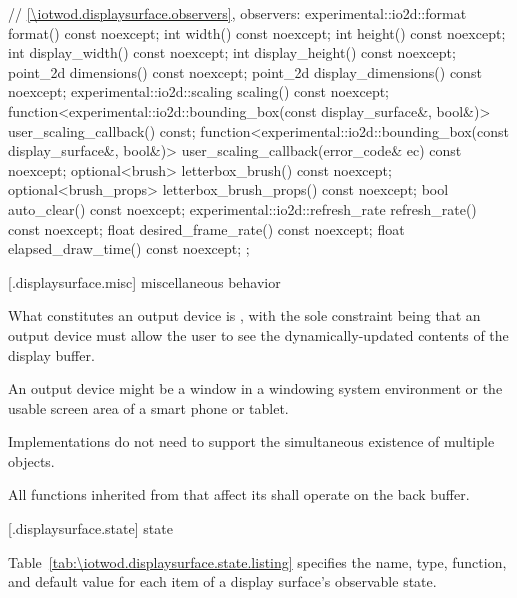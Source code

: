 \begin{codeblock}
{{    // \ref{\iotwod.displaysurface.observers}, observers:
    experimental::io2d::format format() const noexcept;
    int width() const noexcept;
    int height() const noexcept;
    int display_width() const noexcept;
    int display_height() const noexcept;
    point_2d dimensions() const noexcept;
    point_2d display_dimensions() const noexcept;
    experimental::io2d::scaling scaling() const noexcept;
    function<experimental::io2d::bounding_box(const display_surface&,
      bool&)> user_scaling_callback() const;
    function<experimental::io2d::bounding_box(const display_surface&,
      bool&)> user_scaling_callback(error_code& ec) const noexcept;
    optional<brush> letterbox_brush() const noexcept;
    optional<brush_props> letterbox_brush_props() const noexcept;
    bool auto_clear() const noexcept;
    experimental::io2d::refresh_rate refresh_rate() const noexcept;
    float desired_frame_rate() const noexcept;
    float elapsed_draw_time() const noexcept;
  };
}
\end{codeblock}

 [\iotwod.displaysurface.misc] { miscellaneous behavior}

\pnum
What constitutes an output device is , with the sole constraint being that an output device must allow the user to see the dynamically-updated contents of the display buffer.
\begin{example}
An output device might be a window in a windowing system environment or the usable screen area of a smart phone or tablet.
\end{example}

\pnum
Implementations do not need to support the simultaneous existence of multiple  objects.

\pnum
All functions inherited from  that affect its \underlyingsurface shall operate on the back buffer.

 [\iotwod.displaysurface.state] { state}

\pnum
Table~\ref{tab:\iotwod.displaysurface.state.listing} specifies the name, type, function, and default value for each item of a display surface's observable state.

